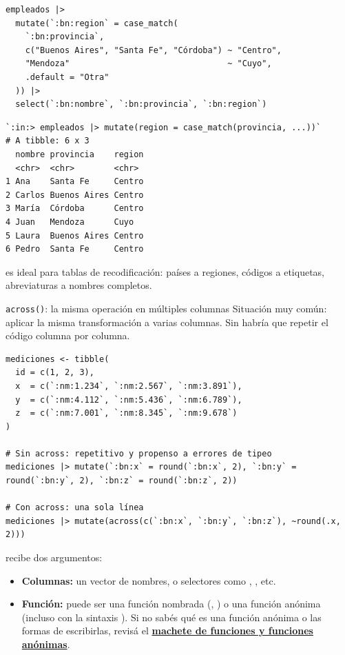 \documentclass[8pt]{beamer}
\begin{document}
	\begin{frame}[fragile]
\begin{lstlisting}[style=RScript]
empleados |>
  mutate(`:bn:region` = case_match(
    `:bn:provincia`,
    c("Buenos Aires", "Santa Fe", "Córdoba") ~ "Centro",
    "Mendoza"                                ~ "Cuyo",
    .default = "Otra"
  )) |>
  select(`:bn:nombre`, `:bn:provincia`, `:bn:region`)
\end{lstlisting}
\begin{lstlisting}[style=RConsole]
`:in:> empleados |> mutate(region = case_match(provincia, ...))`
# A tibble: 6 x 3
  nombre provincia    region
  <chr>  <chr>        <chr>
1 Ana    Santa Fe     Centro
2 Carlos Buenos Aires Centro
3 María  Córdoba      Centro
4 Juan   Mendoza      Cuyo
5 Laura  Buenos Aires Centro
6 Pedro  Santa Fe     Centro
\end{lstlisting}

		\begin{exampleblock}{}
			 es ideal para tablas de recodificación: países a regiones, códigos a etiquetas, abreviaturas a nombres completos.
		\end{exampleblock}
	\end{frame}


	\begin{frame}[fragile]{\texttt{across()}: la misma operación en múltiples columnas}
		Situación muy común: aplicar la misma transformación a varias columnas. Sin  habría que repetir el código columna por columna.

\begin{lstlisting}[style=RScript]
mediciones <- tibble(
  id = c(1, 2, 3),
  x  = c(`:nm:1.234`, `:nm:2.567`, `:nm:3.891`),
  y  = c(`:nm:4.112`, `:nm:5.436`, `:nm:6.789`),
  z  = c(`:nm:7.001`, `:nm:8.345`, `:nm:9.678`)
)

# Sin across: repetitivo y propenso a errores de tipeo
mediciones |> mutate(`:bn:x` = round(`:bn:x`, 2), `:bn:y` = round(`:bn:y`, 2), `:bn:z` = round(`:bn:z`, 2))

# Con across: una sola línea
mediciones |> mutate(across(c(`:bn:x`, `:bn:y`, `:bn:z`), ~round(.x, 2)))
\end{lstlisting}

		 recibe dos argumentos:
		\begin{itemize}
			\item \textbf{Columnas:} un vector de nombres, o selectores como , , etc.
			\item \textbf{Función:} puede ser una función nombrada (, ) o una función anónima (incluso con la sintaxis ). Si no sab\'es qu\'e es una funci\'on an\'onima o las formas de escribirlas, revis\'a el \href{https://github.com/gxono/r_limpieza_manipulacion_exploracion/blob/main/presentaciones/machetes/funciones-anonimas/main.pdf}{\textbf{machete de funciones y funciones an\'onimas}}.
		\end{itemize}
	\end{frame}
\end{document}
